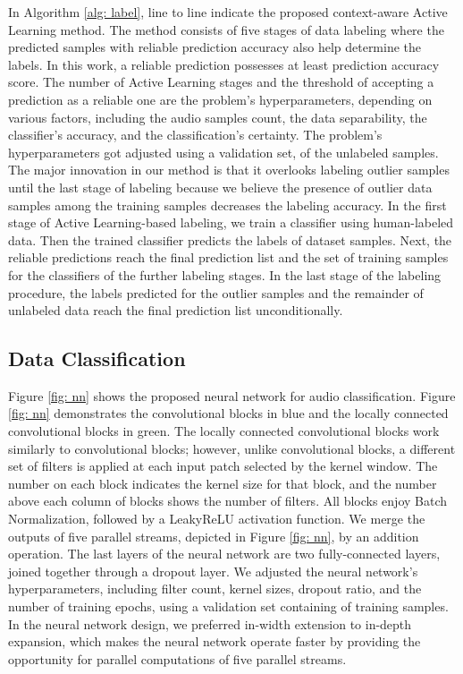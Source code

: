 \documentclass{article}
\begin{document}
In Algorithm \ref{alg: label}, line  to line  indicate the proposed context-aware Active Learning method. The method consists of five stages of data labeling where the predicted samples with reliable prediction accuracy also help determine the labels. In this work, a reliable prediction possesses at least  prediction accuracy score. The number of Active Learning stages and the threshold of accepting a prediction as a reliable one are the problem's hyperparameters, depending on various factors, including the audio samples count, the data separability, the classifier's accuracy, and the classification's certainty. The problem's hyperparameters got adjusted using a validation set,  of the unlabeled samples. The major innovation in our method is that it overlooks labeling outlier samples until the last stage of labeling because we believe the presence of outlier data samples among the training samples decreases the labeling accuracy. In the first stage of Active Learning-based labeling, we train a classifier using human-labeled data. Then the trained classifier predicts the labels of dataset samples. Next, the reliable predictions reach the final prediction list and the set of training samples for the classifiers of the further labeling stages. In the last stage of the labeling procedure, the labels predicted for the outlier samples and the remainder of unlabeled data reach the final prediction list unconditionally.

\subsection{Data Classification}
Figure \ref{fig: nn} shows the proposed neural network for audio classification. Figure \ref{fig: nn} demonstrates the convolutional blocks in blue and the locally connected convolutional blocks in green. The locally connected convolutional blocks work similarly to convolutional blocks; however, unlike convolutional blocks, a different set of filters is applied at each input patch selected by the kernel window. The number on each block indicates the kernel size for that block, and the number above each column of blocks shows the number of filters. All blocks enjoy Batch Normalization, followed by a LeakyReLU activation function. We merge the outputs of five parallel streams, depicted in Figure \ref{fig: nn}, by an addition operation. The last layers of the neural network are two fully-connected layers, joined together through a dropout layer. We adjusted the neural network's hyperparameters, including filter count, kernel sizes, dropout ratio, and the number of training epochs, using a validation set containing  of training samples. In the neural network design, we preferred in-width extension to in-depth expansion, which makes the neural network operate faster by providing the opportunity for parallel computations of five parallel streams.
\end{document}
